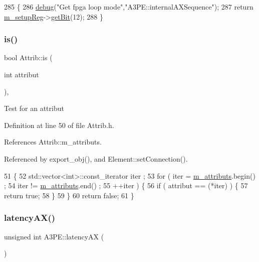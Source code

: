 \begin{DoxyCode}
285                              \{
286   \hyperlink{classObject_aac010553f022165573714b7014a15f0d}{debug}(\textcolor{stringliteral}{"Get fpga loop mode"},\textcolor{stringliteral}{"A3PE::internalAXSequence"});
287   \textcolor{keywordflow}{return} \hyperlink{classA3PE_a142fa10b7e705c4701ae21678ec2ec8a}{m\_setupReg}->\hyperlink{classRegister_a5d27c9ff548817eee097ba4fdc8e8f69}{getBit}(12);
288 \}
\end{DoxyCode}
\mbox{\label{classAttrib_a704f26af560909ad22065083bb7d4c34}} 
\subsubsection{\texorpdfstring{is()}{is()}}
{\footnotesize\ttfamily bool Attrib\+::is (\begin{DoxyParamCaption}\item[{int}]{attribut }\end{DoxyParamCaption})\hspace{0.3cm}{\ttfamily [inline]}, {\ttfamily [inherited]}}

Test for an attribut 

Definition at line 50 of file Attrib.\+h.



References Attrib\+::m\+\_\+attributs.



Referenced by export\+\_\+obj(), and Element\+::set\+Connection().


\begin{DoxyCode}
51   \{
52     std::vector<int>::const\_iterator iter ;
53     \textcolor{keywordflow}{for} ( iter  = \hyperlink{classAttrib_ac4bd58a0cc6b38a3b711d609a3d3aacc}{m\_attributs}.begin() ;
54           iter != \hyperlink{classAttrib_ac4bd58a0cc6b38a3b711d609a3d3aacc}{m\_attributs}.end()   ;
55           ++iter ) \{
56       \textcolor{keywordflow}{if} ( attribut == (*iter) ) \{
57         \textcolor{keywordflow}{return} \textcolor{keyword}{true};
58       \}
59     \}
60     \textcolor{keywordflow}{return} \textcolor{keyword}{false};
61   \}
\end{DoxyCode}
\mbox{\label{classA3PE_ab5970721a8172ae57b3da68040f58199}} 
\subsubsection{\texorpdfstring{latency\+A\+X()}{latencyAX()}}
{\footnotesize\ttfamily unsigned int A3\+P\+E\+::latency\+AX (\begin{DoxyParamCaption}{ }\end{DoxyParamCaption})}



